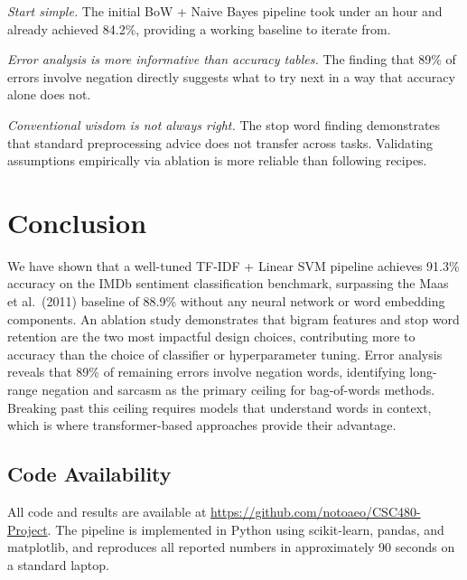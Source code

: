 \documentclass[11pt]{article}
\begin{document}
\textit{Start simple.} The initial BoW + Naive Bayes pipeline took under an hour and already achieved 84.2\%, providing a working baseline to iterate from.

\textit{Error analysis is more informative than accuracy tables.} The finding that 89\% of errors involve negation directly suggests what to try next in a way that accuracy alone does not.

\textit{Conventional wisdom is not always right.} The stop word finding demonstrates that standard preprocessing advice does not transfer across tasks. Validating assumptions empirically via ablation is more reliable than following recipes.

\section{Conclusion}

We have shown that a well-tuned TF-IDF + Linear SVM pipeline achieves 91.3\% accuracy on the IMDb sentiment classification benchmark, surpassing the Maas et al.\ (2011) baseline of 88.9\% without any neural network or word embedding components. An ablation study demonstrates that bigram features and stop word retention are the two most impactful design choices, contributing more to accuracy than the choice of classifier or hyperparameter tuning. Error analysis reveals that 89\% of remaining errors involve negation words, identifying long-range negation and sarcasm as the primary ceiling for bag-of-words methods. Breaking past this ceiling requires models that understand words in context, which is where transformer-based approaches provide their advantage.

\subsection*{Code Availability}

All code and results are available at \url{https://github.com/notoaeo/CSC480-Project}. The pipeline is implemented in Python using scikit-learn, pandas, and matplotlib, and reproduces all reported numbers in approximately 90 seconds on a standard laptop.
\end{document}
